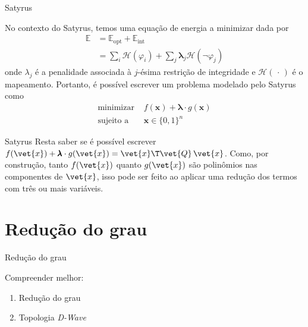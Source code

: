 \documentclass[brazil, MathSerif, aspectratio = 169]{beamer}
\begin{document}
\begin{frame}{Satyrus}

    No contexto do Satyrus, temos uma equação de energia a minimizar dada por
        \begin{align*}
            \mathbb{E} &= \mathbb{E}_\text{opt} + \mathbb{E}_\text{int}\\
                       &= \sum_{i} \mathcal{H} \left( \varphi_i \right) %
                       + \sum_j \pmb{\lambda}_j \mathcal{H} \left( \neg \varphi_j \right)
        \end{align*}
    onde $\lambda_j$ é a penalidade associada à $j$-ésima restrição de integridade e $\mathcal{H} \left(\,\cdot\,\right)$ é o mapeamento. Portanto, é possível escrever um problema modelado pelo Satyrus como
        \begin{align*}
            \text{minimizar } &f(\mathbf{x}) + \pmb{\lambda} \cdot g(\mathbf{x})\\
            \text{sujeito a } &\mathbf{x} \in \{0, 1\}^{n}
        \end{align*}
\end{frame}

\begin{frame}{Satyrus}%
    Resta saber se é possível escrever
        $f(\vet{x}) + \pmb{\lambda} \cdot g(\vet{x}) = \vet{x}\T \vet{Q}\, \vet{x}$.
    Como, por construção, tanto $f(\vet{x})$ quanto $g(\vet{x})$ são polinômios nas componentes de $\vet{x}$, isso pode ser feito ao aplicar uma redução dos termos com três ou mais variáveis.
    
    
\end{frame}

\section{Redução do grau}
\begin{frame}{Redução do grau}

    Compreender melhor:
    \begin{enumerate}%
        \item Redução do grau
        \item Topologia \emph{D-Wave}
    \end{enumerate}
\end{frame}
\end{document}
